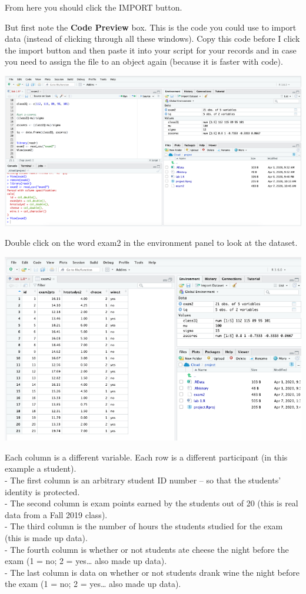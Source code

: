 \documentclass[
]{book}
\begin{document}
From here you should click the IMPORT button.

But first note the \textbf{Code Preview} box. This is the code you could use to import data (instead of clicking through all these windows). Copy this code before I click the import button and then paste it into your script for your records and in case you need to assign the file to an object again (because it is faster with code).

\includegraphics{img/importcomplete.png}

Double click on the word exam2 in the environment panel to look at the dataset.

\includegraphics{img/view.png}

Each column is a different variable. Each row is a different participant (in this example a student).\\
- The first column is an arbitrary student ID number -- so that the students' identity is protected.\\
- The second column is exam points earned by the students out of 20 (this is real data from a Fall 2019 class).\\
- The third column is the number of hours the students studied for the exam (this is made up data).\\
- The fourth column is whether or not students ate cheese the night before the exam (1 = no; 2 = yes\ldots{} also made up data).\\
- The last column is data on whether or not students drank wine the night before the exam (1 = no; 2 = yes\ldots{} also made up data).
\end{document}
